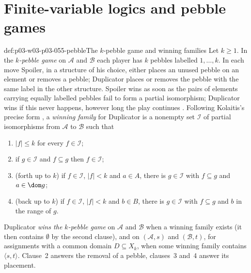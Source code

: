 \section{Finite-variable logics and pebble games}
\label{sec:p03-w03-p03-055-pebble}

\begin{hbdefinition}{def:p03-w03-p03-055-pebble}{The \(k\)-pebble game and winning families}
Let \(k\ge1\). In the \emph{\(k\)-pebble game} on \(\mathcal A\) and
\(\mathcal B\) each player has \(k\) pebbles labelled \(1,\ldots,k\). In
each move Spoiler, in a structure of his choice, either places an unused
pebble on an element or removes a pebble; Duplicator places or removes the
pebble with the same label in the other structure. Spoiler wins as soon as
the pairs of elements carrying equally labelled pebbles fail to form a
partial isomorphism; Duplicator wins if this never happens, however long
the play continues \cite[Def.~7.3, p.~55]{Kolaitis2003ExpressivePowerNotes}.
Following Kolaitis's precise form
\cite[Def.~7.4, p.~55]{Kolaitis2003ExpressivePowerNotes}, a \emph{winning
family} for Duplicator is a nonempty set \(\mathcal I\) of partial
isomorphisms from \(\mathcal A\) to \(\mathcal B\) such that
\begin{enumerate}
\item \(|f|\le k\) for every \(f\in\mathcal I\);
\item if \(g\in\mathcal I\) and \(f\subseteq g\) then \(f\in\mathcal I\);
\item (forth up to \(k\)) if \(f\in\mathcal I\), \(|f|<k\) and
      \(a\in A\), there is \(g\in\mathcal I\) with \(f\subseteq g\) and
      \(a\in\dom g\);
\item (back up to \(k\)) if \(f\in\mathcal I\), \(|f|<k\) and
      \(b\in B\), there is \(g\in\mathcal I\) with \(f\subseteq g\) and
      \(b\) in the range of \(g\).
\end{enumerate}
Duplicator \emph{wins the \(k\)-pebble game} on \(\mathcal A\) and
\(\mathcal B\) when a winning family exists (it then contains \(\emptyset\)
by the second clause), and on \((\mathcal A,s)\) and \((\mathcal B,t)\),
for assignments with a common domain \(D\subseteq X_k\), when some winning
family contains \(\langle s,t\rangle\). Clause~2 answers the removal of a
pebble, clauses~3 and~4 answer its placement.
\end{hbdefinition}

